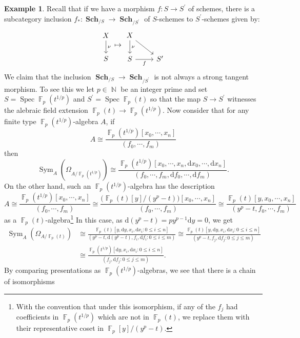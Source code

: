 \documentclass{amsart}
\theoremstyle{definition}
\newtheorem{example}[equation]{Example}
\DeclareMathOperator{\Fbb}{\mathbb{F}}
\DeclareMathOperator{\sym}{Sym}
\DeclareMathOperator{\N}{\mathbb{N}}
\DeclareMathOperator{\Spec}{Spec}
\newcommand{\Sym}[1]{\sym_{#1}}
\DeclareMathOperator{\Sch}{\mathbf{Sch}}
\newcommand{\Kah}[2]{\Omega_{{#1}/{#2}}}
\numberwithin{equation}{subsection}
\begin{document}
\begin{example}\label{Example: Inclusion of varieties is not strong tangent mor}
	Recall that if we have a morphism $f:S \to S^{\prime}$ of schemes, there is a subcategory inclusion $f_{\ast}:\Sch_{/S} \to \Sch_{/S^{\prime}}$ of  $S$-schemes to $S^{\prime}$-schemes given by:
	\[
	\begin{tikzcd}
		X \ar[d]{}{\nu} \\
		S
	\end{tikzcd} \mapsto \begin{tikzcd}
		X \ar[d]{}{\nu} \ar[dr] \\
		S \ar[r, swap]{}{f} & S^{\prime}
	\end{tikzcd}
	\]
	We claim that the inclusion $\Sch_{/S} \to \Sch_{/S^{\prime}}$ is not always a strong tangent morphism. To see this we let $p \in \N$ be an integer prime and set $S = \Spec \Fbb_p(t^{1/p})$ and $S^{\prime} = \Spec \Fbb_p(t)$ so that the map $S \to S^{\prime}$ witnesses the alebraic field extension $\Fbb_p(t) \to \Fbb_p(t^{1/p})$. Now consider that for any finite type $\Fbb_p(t^{1/p})$-algebra $A$, if
	\[
	A \cong \frac{\Fbb_p(t^{1/p})[x_0, \cdots, x_n]}{(f_0, \cdots, f_m)}
	\]
	then 
	\[
	\Sym{A}\left(\Kah{A}{\Fbb_p(t^{1/p})}\right) \cong \frac{\Fbb_p(t^{1/p})[x_0, \cdots, x_n, \mathrm{d}x_0, \cdots, \mathrm{d}x_n]}{(f_0, \cdots, f_m, \mathrm{d}f_0, \cdots, \mathrm{d}f_m)}.
	\]
	On the other hand, such an $\Fbb_p(t^{1/p})$-algebra has the description
	\[
	A \cong \frac{\Fbb_p(t^{1/p})[x_0, \cdots, x_n]}{(f_0, \cdots, f_m)} \cong \frac{\big(\Fbb_p(t)[y]/(y^p-t)\big)[x_0, \cdots, x_n]}{(f_0, \cdots, f_m)} \cong \frac{\Fbb_p(t)[y,x_0, \cdots, x_n]}{(y^p-t, f_0, \cdots, f_m)}
	\]
	as a $\Fbb_p(t)$-algebra\footnote{With the convention that under this isomorphism, if any of the $f_j$ had coefficients in $\Fbb_p(t^{1/p})$ which are not in $\Fbb_p(t)$, we replace them with their representative coset in $\Fbb_p[y]/(y^p-t)$.} In this case, as $\mathrm{d}(y^p-t) = py^{p-1}\mathrm{d}y = 0$, we get
	\begin{align*}
		\Sym{A}\left(\Kah{A}{\Fbb_p(t)}\right) &\cong \frac{\Fbb_p(t)[y, \mathrm{d}y, x_i, \mathrm{d}x_i : 0 \leq i \leq n]}{(y^p-t,\mathrm{d}(y^p-t),f_i, \mathrm{d}f_i : 0 \leq i \leq m)} \cong \frac{\Fbb_p(t)[y,\mathrm{d}y, x_i,\mathrm{d}x_i:0 \leq i\leq n]}{(y^p-t,f_j,\mathrm{d}f_j:0 \leq j \leq m)} \\
		&\cong \frac{\Fbb_p(t^{1/p})[\mathrm{d}y,x_i,\mathrm{d}x_i:0 \leq i \leq n]}{(f_j,\mathrm{d}f_j:0 \leq j \leq m)}.
	\end{align*}
	By comparing presentations as $\Fbb_p(t^{1/p})$-algebras, we see that there is a chain of isomorphisms

\end{example}
\end{document}
